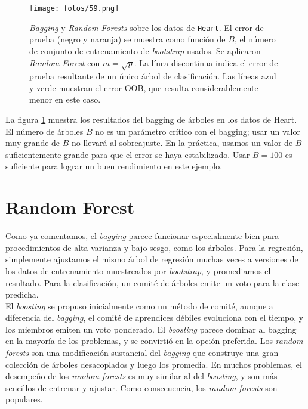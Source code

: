 \begin{figure}[h]
\centering
\texttt{[image: fotos/59.png]}
\caption{\textit{Bagging} y \textit{Random Forests} sobre los datos de \texttt{Heart}. El error de prueba (negro y naranja) se muestra como función de $B$, el número de conjunto de entrenamiento de \textit{bootstrap} usados. Se aplicaron \textit{Random Forest} con $m = \sqrt{p}$. La línea discontinua indica el error de prueba resultante de un único árbol de clasificación. Las líneas azul y verde muestran el error OOB, que resulta considerablemente menor en este caso. }
\label{fig:20.8}
\end{figure}

La figura \ref{fig:20.8} muestra los resultados del bagging de árboles en los datos de Heart. El número de árboles $B$ no es un parámetro crítico con el bagging; usar un valor muy grande de $B$ no llevará al sobreajuste. En la práctica, usamos un valor de $B$ suficientemente grande para que el error se haya estabilizado. Usar $B = 100$ es suficiente para lograr un buen rendimiento en este ejemplo.

\section{Random Forest}

Como ya comentamos, el \textit{bagging} parece funcionar especialmente bien para procedimientos de alta varianza y bajo sesgo, como los árboles. Para la regresión, simplemente ajustamos el mismo árbol de regresión muchas veces a versiones de los datos de entrenamiento muestreados por \textit{bootstrap}, y promediamos el resultado. Para la clasificación, un comité de árboles emite un voto para la clase predicha. \\

El \textit{boosting} se propuso inicialmente como un método de comité, aunque a diferencia del \textit{bagging}, el comité de aprendices débiles evoluciona con el tiempo, y los miembros emiten un voto ponderado. El \textit{boosting} parece dominar al bagging en la mayoría de los problemas, y se convirtió en la opción preferida. Los \textit{random forests} son una modificación sustancial del \textit{bagging} que construye una gran colección de árboles desacoplados y luego los promedia. En muchos problemas, el desempeño de los \textit{random forests} es muy similar al del \textit{boosting}, y son más sencillos de entrenar y ajustar. Como consecuencia, los \textit{random forests} son populares. 

